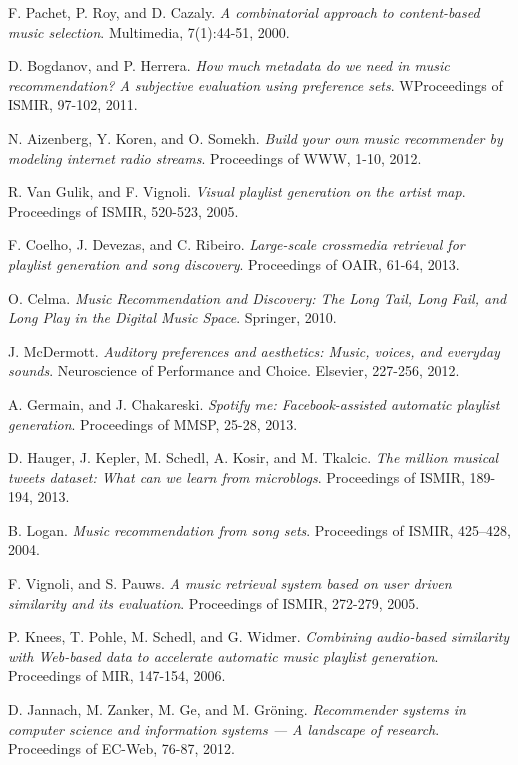\documentclass[11pt, oneside]{Thesis} %
\begin{document}
\begin{thebibliography}{99}
F. Pachet, P. Roy, and D. Cazaly.
\textit{A combinatorial approach to content-based music selection}.
Multimedia, 7(1):44-51, 2000.

D. Bogdanov, and P. Herrera.
\textit{How much metadata do we need in music recommendation? A subjective evaluation using preference sets}.
WProceedings of ISMIR, 97-102, 2011.

N. Aizenberg, Y. Koren, and O. Somekh.
\textit{Build your own music recommender by modeling internet radio streams}.
Proceedings of WWW, 1-10, 2012.

R. Van Gulik, and F. Vignoli.
\textit{Visual playlist generation on the artist map}.
Proceedings of ISMIR, 520-523, 2005.

F. Coelho, J. Devezas, and C. Ribeiro.
\textit{Large-scale crossmedia retrieval for playlist generation and song discovery}.
Proceedings of OAIR, 61-64, 2013.

O. Celma. 
\textit{Music Recommendation and Discovery: The Long Tail, Long Fail, and Long Play in the Digital Music Space}.
Springer, 2010.

J. McDermott.
\textit{Auditory preferences and aesthetics: Music, voices, and everyday sounds}.
Neuroscience of Performance and Choice. Elsevier, 227-256, 2012.

A. Germain, and J. Chakareski.
\textit{Spotify me: Facebook-assisted automatic playlist generation}.
Proceedings of MMSP, 25-28, 2013.

D. Hauger, J. Kepler, M. Schedl, A. Kosir, and M. Tkalcic.
\textit{The million musical tweets dataset: What can we learn from microblogs}.
Proceedings of ISMIR, 189-194, 2013.

B. Logan. 
\textit{Music recommendation from song sets}.
Proceedings of ISMIR, 425–428, 2004.

F. Vignoli, and S. Pauws.
\textit{A music retrieval system based on user driven similarity and its evaluation}.
Proceedings of ISMIR, 272-279, 2005.

P. Knees, T. Pohle, M. Schedl, and G. Widmer.
\textit{Combining audio-based similarity with Web-based data to accelerate automatic music playlist generation}.
Proceedings of MIR, 147-154, 2006.

D. Jannach, M. Zanker, M. Ge, and M. Gr\"{o}ning.
\textit{Recommender systems in computer science and information systems — A landscape of research}.
Proceedings of EC-Web, 76-87, 2012.


\end{thebibliography}
\end{document}
